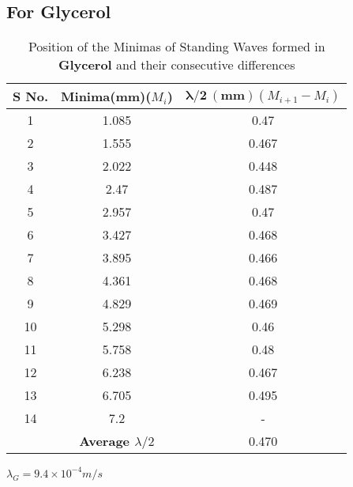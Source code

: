 \subsection{For Glycerol}
\begin{table}[H]
         \centering
        \begin{tabular}{|c|c|c|}
             \hline
        \textbf{S No.} & \textbf{Minima(mm)($M_i$)} & $\mathbf{\lambda/2\:(mm)}$$(M_{i+1}-M_i)$ \\
        \hline
       1&	1.085&	0.47\\
2&	1.555&	0.467\\
3&	2.022&	0.448\\
4&	2.47&	0.487\\
5&	2.957&	0.47\\
6&	3.427&	0.468\\
7&	3.895&	0.466\\
8&	4.361&	0.468\\
9&	4.829&	0.469\\
10&	5.298&	0.46\\
11&	5.758&	0.48\\
12&	6.238&	0.467\\
13&	6.705&	0.495\\
14&	7.2&	-\\
        \hline
        &\textbf{Average $\lambda/2$} & 0.470\\
    \hline
    \end{tabular}
      $\lambda_{G} = 9.4 \times 10^{-4} m/s$
    \caption{Position of the Minimas of Standing Waves formed in \textbf{Glycerol} and their consecutive differences}
    \end{table}
\pagebreak    
